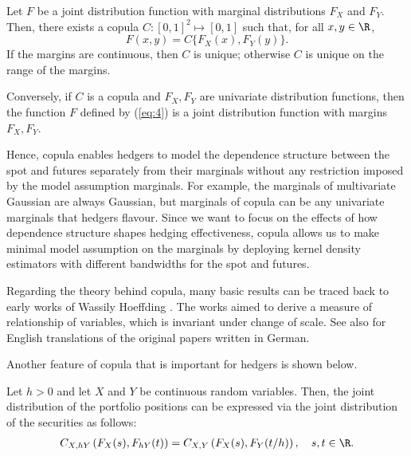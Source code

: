 \begin{theorem}
  \label{theorem:sklar}
  Let $F$ be a joint distribution function with marginal distributions
  $F_X$ and $F_Y$. Then, there exists a copula $C:[0,1]^2 \mapsto
  [0,1]$ such that, for all $x,y\in \R$,
  \begin{equation}
    \label{eq:4}
    F(x,y)=C\{F_X(x), F_Y(y)\}.
  \end{equation}
  If the margins are continuous, then $C$ is unique; otherwise $C$ is
  unique on the range of the margins.

  Conversely, if $C$ is a copula and $F_X, F_Y$ are univariate
  distribution functions, then the function $F$ defined by (\ref{eq:4})
  is a joint distribution function with margins $F_X, F_Y$.
\end{theorem}

Hence, copula enables hedgers to model the dependence structure between the spot and futures separately from their marginals 
without any restriction imposed by the model assumption marginals.
For example, the marginals of multivariate Gaussian are always Gaussian, but marginals of copula can be any univariate marginals that hedgers flavour. 
Since we want to focus on the effects of how dependence structure shapes hedging effectiveness, copula allows us to
make minimal model assumption on the marginals by deploying kernel density estimators with different bandwidths for the spot and futures. 

Regarding the theory behind copula, many basic results can be traced back to early
works of Wassily Hoeffding \citep{hoedffding1940, hoedffding1941}. 
The works aimed to derive a measure of relationship of variables,
which is invariant under change of scale. 
See also \citet{hoeffding2012collected} for English translations of
the original papers written in German. 

Another feature of copula that is important for hedgers is shown below. 

\begin{lemma}
  \label{lemma:copula}
  Let $h>0$ and let $X$ and $Y$ be continuous random variables. Then,
  the joint distribution of the portfolio positions 
  can be expressed via the joint distribution of the securities as
  follows:
  \begin{align}
  C_{X, hY}\left(F_X(s),F_{hY}(t)\right) = C_{X,
    Y}\left(F_X(s),F_{Y}(t/h)\right), \quad s,t\in \R.
    \end{align}
  \end{lemma}

